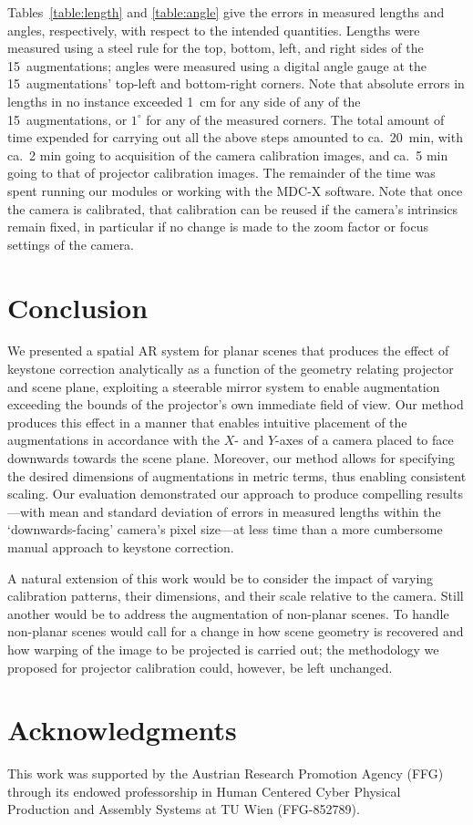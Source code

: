 \documentclass[review]{elsarticle}
\begin{document}
Tables~\ref{table:length} and \ref{table:angle} give the errors in measured lengths and angles, respectively, with respect to the intended quantities. Lengths were measured using a steel rule for the top, bottom, left, and right sides of the 15~augmentations; angles were measured using a digital angle gauge at the 15~augmentations' top-left and bottom-right corners. Note that absolute errors in lengths in no instance exceeded 1~cm for any side of any of the 15~augmentations, or $1^\circ{}$ for any of the measured corners. The total amount of time expended for carrying out all the above steps amounted to ca.\ 20~min, with ca.\ 2 min going to acquisition of the camera calibration images, and ca.\ 5 min going to that of projector calibration images. The remainder of the time was spent running our modules or working with the MDC-X software. Note that once the camera is calibrated, that calibration can be reused if the camera's intrinsics remain fixed, in particular if no change is made to the zoom factor or focus settings of the camera.

\section{Conclusion}

We presented a spatial AR system for planar scenes that produces the effect of keystone correction analytically as a function of the geometry relating projector and scene plane, exploiting a steerable mirror system to enable augmentation exceeding the bounds of the projector's own immediate field of view. Our method produces this effect in a manner that enables intuitive placement of the augmentations in accordance with the $X$- and $Y$-axes of a camera placed to face downwards towards the scene plane. Moreover, our method allows for specifying the desired dimensions of augmentations in metric terms, thus enabling consistent scaling. Our evaluation demonstrated our approach to produce compelling results---with mean and standard deviation of errors in measured lengths within the `downwards-facing' camera's pixel size---at less time than a more cumbersome manual approach to keystone correction.

A natural extension of this work would be to consider the impact of varying calibration patterns, their dimensions, and their scale relative to the camera. Still another would be to address the augmentation of non-planar scenes. To handle non-planar scenes would call for a change in how scene geometry is recovered and how warping of the image to be projected is carried out; the methodology we proposed for projector calibration could, however, be left unchanged.

\section{Acknowledgments}

This work was supported by the Austrian Research Promotion Agency (FFG) through its endowed professorship in Human Centered Cyber Physical Production and Assembly Systems at TU Wien (FFG-852789).


\end{document}
